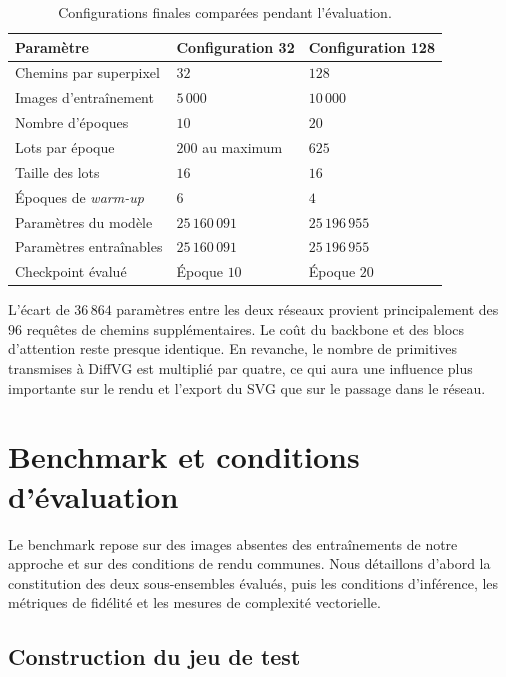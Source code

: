 \documentclass[12pt, a4paper, oneside]{report}
\begin{document}
\begin{table}[H]
    \centering
    \small
    \caption{Configurations finales comparées pendant l'évaluation.}
    \label{tab:configurations_evaluees}
    \begin{tabular}{p{5.1cm}p{3.5cm}p{3.5cm}}
        \toprule
        \textbf{Paramètre} & \textbf{Configuration 32} & \textbf{Configuration 128} \\
        \midrule
        Chemins par superpixel & $32$ & $128$ \\
        Images d'entraînement & $5\,000$ & $10\,000$ \\
        Nombre d'époques & $10$ & $20$ \\
        Lots par époque & $200$ au maximum & $625$ \\
        Taille des lots & $16$ & $16$ \\
        Époques de \textit{warm-up} & $6$ & $4$ \\
        Paramètres du modèle & $25\,160\,091$ & $25\,196\,955$ \\
        Paramètres entraînables & $25\,160\,091$ & $25\,196\,955$ \\
        Checkpoint évalué & Époque $10$ & Époque $20$ \\
        \bottomrule
    \end{tabular}
\end{table}

L'écart de $36\,864$ paramètres entre les deux réseaux provient principalement des $96$ requêtes de chemins supplémentaires. Le coût du backbone et des blocs d'attention reste presque identique. En revanche, le nombre de primitives transmises à DiffVG est multiplié par quatre, ce qui aura une influence plus importante sur le rendu et l'export du SVG que sur le passage dans le réseau.

\section{Benchmark et conditions d'évaluation}
\label{sec:protocole_evaluation}

Le benchmark repose sur des images absentes des entraînements de notre approche et sur des conditions de rendu communes. Nous détaillons d'abord la constitution des deux sous-ensembles évalués, puis les conditions d'inférence, les métriques de fidélité et les mesures de complexité vectorielle.

\subsection{Construction du jeu de test}
\end{document}
